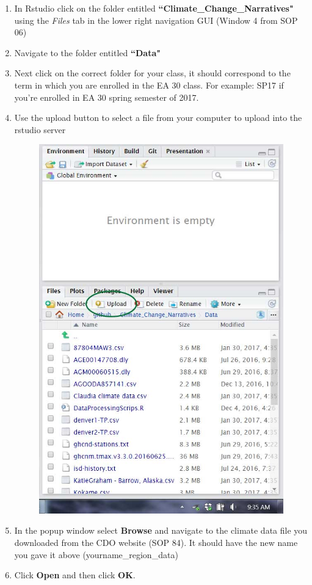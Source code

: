 \documentclass{article}\usepackage[]{graphicx}\usepackage[]{color}
\begin{document}
  \begin{enumerate}
  \item In Rstudio click on the folder entitled \textbf{``Climate\_Change\_Narratives"} using the \textit{Files} tab in the lower right navigation GUI (Window 4 from SOP 06)
  \item Navigate to the folder entitled \textbf{``Data"} 
  \item Next click on the correct folder for your class, it should correspond to the term in which you are enrolled in the EA 30 class. For example: SP17 if you're enrolled in EA 30 spring semester of 2017.
  \item Use the upload button to select a file from your computer to upload into the rstudio server
  \begin{figure}[h]
  \includegraphics[scale=0.25]{"../graphics/Upload_button"}
  \end{figure}
  \item In the popup window select \textbf{Browse} and navigate to the climate data file you downloaded from the CDO website (SOP 84). It should have the new name you gave it above (yourname\_region\_data)
  \item Click \textbf{Open} and then click \textbf{OK}. 
  
  \end{enumerate}
\end{document}
